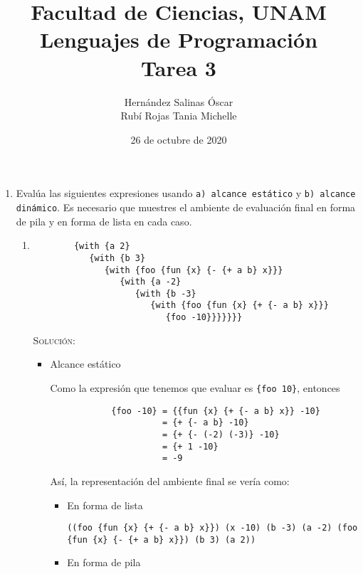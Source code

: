 \documentclass[letterpaper,11pt]{article}
\title{Facultad de Ciencias, UNAM \\ 
       Lenguajes de Programación \\ 
       Tarea 3}
\author{Hernández Salinas Óscar \\ 
        Rubí Rojas Tania Michelle }
\date{26 de octubre de 2020}
\begin{document}
\maketitle

\begin{enumerate}
    \item Evalúa las siguientes expresiones usando \texttt{a) alcance estático}
    y \texttt{b) alcance dinámico}. Es necesario que muestres el ambiente de 
    evaluación final en forma de pila y en forma de lista en cada caso.
    \begin{enumerate}
        \item 
        \begin{verbatim}
        {with {a 2} 
           {with {b 3} 
              {with {foo {fun {x} {- {+ a b} x}}} 
                 {with {a -2} 
                    {with {b -3} 
                       {with {foo {fun {x} {+ {- a b} x}}} 
                          {foo -10}}}}}}}
        \end{verbatim}
        
        \textsc{Solución:}
        \begin{itemize}
            \item Alcance estático

            Como la expresión que tenemos que evaluar es \texttt{\{foo 10\}}, 
            entonces 
            \begin{verbatim}
            {foo -10} = {{fun {x} {+ {- a b} x}} -10}
                      = {+ {- a b} -10}
                      = {+ {- (-2) (-3)} -10}
                      = {+ 1 -10}
                      = -9
            \end{verbatim}

            Así, la representación del ambiente final se vería como:
            \begin{itemize}
                \item En forma de lista
                \begin{center}
                    \texttt{((foo \{fun \{x\} \{+ \{- a b\} x\}\}) (x -10) (b -3)
                            (a -2) (foo \{fun \{x\} \{- \{+ a b\} x\}\}) (b 3) 
                            (a 2))}
                \end{center}

                \newpage
                \item En forma de pila 
            \end{itemize}



\end{itemize}
\end{enumerate}
\end{enumerate}
\end{document}

